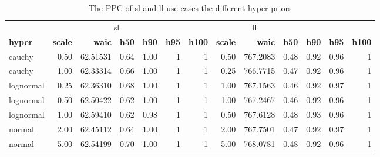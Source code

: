 \documentclass[twoside,11pt,preprint]{article}
\begin{document}
\begin{table}

\caption{\label{tab:hyperxz2}\label{tab:hyper1b}The PPC of sl and ll use cases the different hyper-priors}
\centering
\begin{tabular}[t]{lrrrrrrrrrrrr}
\toprule
\multicolumn{1}{c}{ } & \multicolumn{5}{c}{sl} & \multicolumn{5}{c}{ll} \\
\cmidrule(l{3pt}r{3pt}){2-6} \cmidrule(l{3pt}r{3pt}){7-11}
\textbf{\textbf{hyper}} & \textbf{\textbf{scale}} & \textbf{\textbf{waic}} & \textbf{\textbf{h50}} & \textbf{\textbf{h90}} & \textbf{\textbf{h95}} & \textbf{\textbf{h100}} & \textbf{\textbf{scale}} & \textbf{\textbf{waic}} & \textbf{\textbf{h50}} & \textbf{\textbf{h90}} & \textbf{\textbf{h95}} & \textbf{\textbf{h100}}\\
\midrule
cauchy & 0.50 & 62.51531 & 0.64 & 1.00 & 1 & 1 & 0.50 & 767.2083 & 0.48 & 0.92 & 0.96 & 1\\
cauchy & 1.00 & 62.33314 & 0.66 & 1.00 & 1 & 1 & 0.25 & 766.7715 & 0.47 & 0.92 & 0.96 & 1\\
lognormal & 0.25 & 62.36310 & 0.68 & 1.00 & 1 & 1 & 1.00 & 767.1563 & 0.46 & 0.92 & 0.97 & 1\\
lognormal & 0.50 & 62.50422 & 0.62 & 1.00 & 1 & 1 & 1.00 & 767.2467 & 0.46 & 0.92 & 0.96 & 1\\
lognormal & 1.00 & 62.59410 & 0.62 & 0.98 & 1 & 1 & 0.50 & 767.6128 & 0.48 & 0.93 & 0.96 & 1\\
\addlinespace
normal & 2.00 & 62.45112 & 0.64 & 1.00 & 1 & 1 & 2.00 & 767.7501 & 0.47 & 0.92 & 0.97 & 1\\
normal & 5.00 & 62.54199 & 0.70 & 1.00 & 1 & 1 & 5.00 & 768.0781 & 0.48 & 0.92 & 0.96 & 1\\
\bottomrule
\end{tabular}
\end{table}

\newpage

\vskip 0.2in

\end{document}
